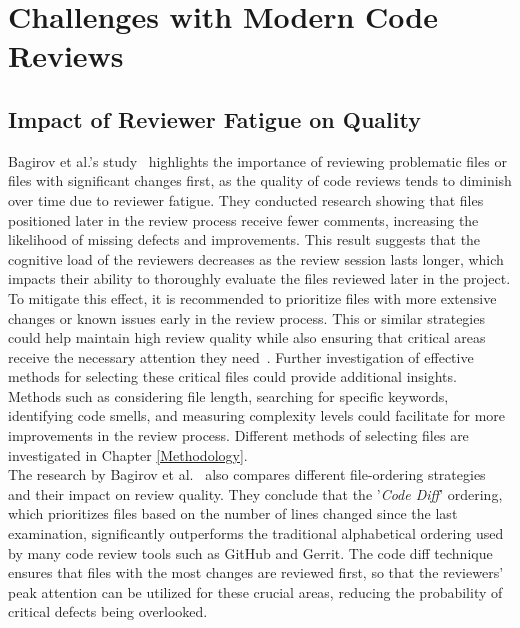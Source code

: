 \section{Challenges with Modern Code Reviews}

\subsection{Impact of Reviewer Fatigue on Quality}\label{Reviewer_Fatigue}
Bagirov et al.'s study~\cite{Bagirov_2023} highlights the importance of reviewing problematic files or files with significant changes first, as the quality of code reviews tends to diminish over time due to reviewer fatigue. They conducted research showing that files positioned later in the review process receive fewer comments, increasing the likelihood of missing defects and improvements. This result suggests that the cognitive load of the reviewers decreases as the review session lasts longer, which impacts their ability to thoroughly evaluate the files reviewed later in the project. To mitigate this effect, it is recommended to prioritize files with more extensive changes or known issues early in the review process. This or similar strategies could help maintain high review quality while also ensuring that critical areas receive the necessary attention they need~\cite{Bagirov_2023}. Further investigation of effective methods for selecting these critical files could provide additional insights. Methods such as considering file length, searching for specific keywords, identifying code smells, and measuring complexity levels could facilitate for more improvements in the review process. Different methods of selecting files are investigated in Chapter \ref{Methodology}. \\

The research by Bagirov et al.~\cite{Bagirov_2023} also compares different file-ordering strategies and their impact on review quality. They conclude that the '\textit{Code Diff}' ordering, which prioritizes files based on the number of lines changed since the last examination, significantly outperforms the traditional alphabetical ordering used by many code review tools such as GitHub and Gerrit. The code diff technique ensures that files with the most changes are reviewed first, so that the reviewers' peak attention can be utilized for these crucial areas, reducing the probability of critical defects being overlooked. \\
\newpage


